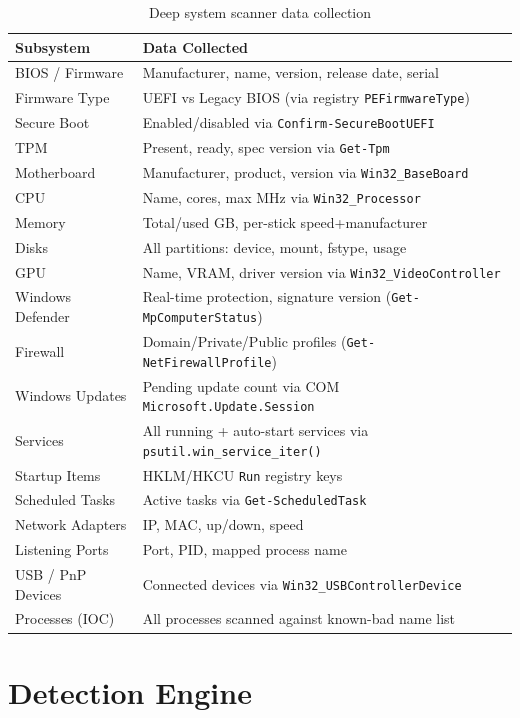 \documentclass[12pt,a4paper]{article}
\begin{document}
\begin{table}[H]
\centering
\begin{tabularx}{\linewidth}{lX}
\toprule
\textbf{Subsystem} & \textbf{Data Collected} \\
\midrule
BIOS / Firmware & Manufacturer, name, version, release date, serial \\
Firmware Type & UEFI vs Legacy BIOS (via registry \texttt{PEFirmwareType}) \\
Secure Boot & Enabled/disabled via \texttt{Confirm-SecureBootUEFI} \\
TPM & Present, ready, spec version via \texttt{Get-Tpm} \\
Motherboard & Manufacturer, product, version via \texttt{Win32\_BaseBoard} \\
CPU & Name, cores, max MHz via \texttt{Win32\_Processor} \\
Memory & Total/used GB, per-stick speed+manufacturer \\
Disks & All partitions: device, mount, fstype, usage \\
GPU & Name, VRAM, driver version via \texttt{Win32\_VideoController} \\
Windows Defender & Real-time protection, signature version (\texttt{Get-MpComputerStatus}) \\
Firewall & Domain/Private/Public profiles (\texttt{Get-NetFirewallProfile}) \\
Windows Updates & Pending update count via COM \texttt{Microsoft.Update.Session} \\
Services & All running + auto-start services via \texttt{psutil.win\_service\_iter()} \\
Startup Items & HKLM/HKCU \texttt{Run} registry keys \\
Scheduled Tasks & Active tasks via \texttt{Get-ScheduledTask} \\
Network Adapters & IP, MAC, up/down, speed \\
Listening Ports & Port, PID, mapped process name \\
USB / PnP Devices & Connected devices via \texttt{Win32\_USBControllerDevice} \\
Processes (IOC) & All processes scanned against known-bad name list \\
\bottomrule
\end{tabularx}
\caption{Deep system scanner data collection}
\end{table}

\section{Detection Engine}
\end{document}
